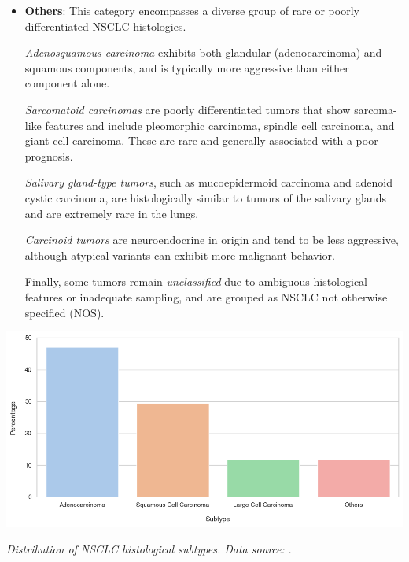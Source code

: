 \begin{itemize}
    \item \textbf{Others}: This category encompasses a diverse group of rare or poorly 
    differentiated NSCLC histologies.
    
    \textit{Adenosquamous carcinoma} exhibits both glandular (adenocarcinoma) and squamous 
    components, and is typically more aggressive than either component alone.
    
    \textit{Sarcomatoid carcinomas} are poorly differentiated tumors that show sarcoma-like features 
    and include pleomorphic carcinoma, spindle cell carcinoma, and giant cell carcinoma. These are 
    rare and generally associated with a poor prognosis.
    
    \textit{Salivary gland-type tumors}, such as mucoepidermoid carcinoma and adenoid cystic 
    carcinoma, are histologically similar to tumors of the salivary glands and are extremely rare in 
    the lungs.
    
    \textit{Carcinoid tumors} are neuroendocrine in origin and tend to be less aggressive, although 
    atypical variants can exhibit more malignant behavior.
    
    Finally, some tumors remain \textit{unclassified} due to ambiguous histological features or 
    inadequate sampling, and are grouped as NSCLC not otherwise specified (NOS). \cite{travis2015}
\end{itemize}

\vspace{1em}
\begin{center}
    \includegraphics[width=1.00\textwidth]{../assets/01-overview/nsclc-dist.png}

    \small\textit{Distribution of NSCLC histological subtypes. Data source: \cite{nlm2025}}.
\end{center}
\vspace{1em}

